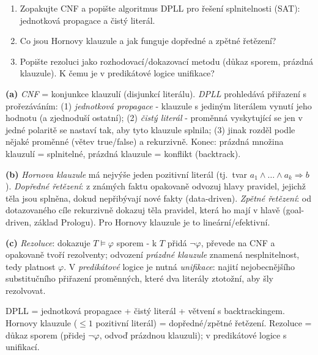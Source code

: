 \begin{zadani}
\begin{enumerate}[label=(\alph*)]
  \item {} Zopakujte CNF a popište algoritmus DPLL pro řešení splnitelnosti (SAT): jednotková propagace a čistý literál.
  \item {} Co jsou Hornovy klauzule a jak funguje dopředné a zpětné řetězení?
  \item {} Popište rezoluci jako rozhodovací/dokazovací metodu (důkaz sporem, prázdná klauzule). K čemu je v predikátové logice unifikace?
\end{enumerate}
\end{zadani}

\begin{reseni}
\textbf{(a)} \emph{CNF} = konjunkce klauzulí (disjunkcí literálu). \emph{DPLL} prohledává přiřazení s prořezáváním: (1) \emph{jednotková propagace} - klauzule s jediným literálem vynutí jeho hodnotu (a zjednoduší ostatní); (2) \emph{čistý literál} - proměnná vyskytující se jen v jedné polaritě se nastaví tak, aby tyto klauzule splnila; (3) jinak rozděl podle nějaké proměnné (větev true/false) a rekurzivně. Konec: prázdná množina klauzulí = splnitelné, prázdná klauzule = konflikt (backtrack).

\textbf{(b)} \emph{Hornova klauzule} má nejvýše jeden pozitivní literál (tj.\ tvar $a_1\wedge\dots\wedge a_k\Rightarrow b$). \emph{Dopředné řetězení}: z známých faktu opakovaně odvozuj hlavy pravidel, jejichž těla jsou splněna, dokud nepřibývají nové fakty (data-driven). \emph{Zpětné řetězení}: od dotazovaného cíle rekurzivně dokazuj těla pravidel, která ho mají v hlavě (goal-driven, základ Prologu). Pro Hornovy klauzule je to lineární/efektivní.

\textbf{(c)} \emph{Rezoluce}: dokazuje $T\models\varphi$ sporem - k $T$ přidá $\neg\varphi$, převede na CNF a opakovaně tvoří rezolventy; odvození \emph{prázdné klauzule} znamená nesplnitelnost, tedy platnost $\varphi$. V \emph{predikátové} logice je nutná \emph{unifikace}: najití nejobecnějšího substitučního přiřazení proměnných, které dva literály ztotožní, aby šly rezolvovat.
\end{reseni}

\begin{jadro}
DPLL = jednotková propagace + čistý literál + větvení s backtrackingem. Hornovy klauzule ($\le1$ pozitivní literál) = dopředné/zpětné řetězení. Rezoluce = důkaz sporem (přidej $\neg\varphi$, odvoď prázdnou klauzuli); v predikátové logice s unifikací.
\end{jadro}

